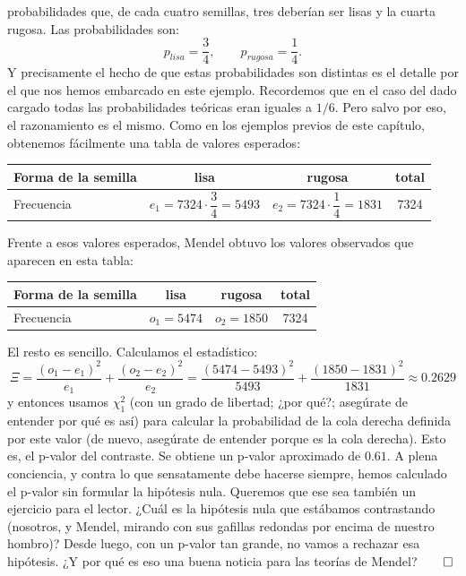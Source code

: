 \begin{ejemplo}
probabilidades
que, de cada cuatro semillas, tres deberían ser lisas y la cuarta rugosa. Las probabilidades son:
    \[p_{lisa}=\dfrac{3}{4},\qquad p_{rugosa}=\dfrac{1}{4}.\]
Y precisamente el hecho de que estas probabilidades son distintas es el detalle por el que nos
hemos embarcado en este ejemplo. Recordemos que en el caso del dado cargado todas las probabilidades
teóricas eran iguales a $1/6$. Pero salvo por eso, el razonamiento es el mismo.  Como en los
ejemplos previos de este capítulo, obtenemos fácilmente una tabla de valores esperados:
    \begin{center}
    \begin{tabular}{|l|c|c|c|}
      \hline
      Forma de la semilla & lisa & rugosa & total\\
      \hline
      Frecuencia \rule{0cm}{0.6cm}& $e_1=7324\cdot\dfrac{3}{4}=5493$ & $e_2=7324\cdot\dfrac{1}{4}=1831$ & 7324\\[2mm]
      \hline
    \end{tabular}
    \end{center}
Frente a esos valores esperados, Mendel obtuvo los valores observados que aparecen en esta tabla:
    \begin{center}
    \begin{tabular}{|l|c|c|c|}
      \hline
      Forma de la semilla & lisa & rugosa & total\\
      \hline
      Frecuencia \rule{0cm}{0.6cm}& $o_1=5474$ & $o_2=1850$ & 7324\\[2mm]
      \hline
    \end{tabular}
    \end{center}
El resto es sencillo. Calculamos el estadístico:
    \[\Xi=\dfrac{(o_1-e_1)^2}{e_1}+\dfrac{(o_2-e_2)^2}{e_2}= \dfrac{(5474-5493)^2}{5493}+\dfrac{(1850-1831)^2}{1831}\approx 0.2629\]
y entonces usamos $\chi^2_1$ (con un grado de libertad; ¿por qué?; asegúrate de entender por qué es así) para calcular la probabilidad de la cola derecha definida por este valor (de nuevo, asegúrate
de entender porque es la cola derecha). Esto es, el p-valor del contraste. Se obtiene un p-valor
aproximado de $0.61$. A plena conciencia, y contra lo que sensatamente debe hacerse siempre, hemos
calculado el p-valor sin formular la hipótesis nula. Queremos que ese sea también un ejercicio para
el lector. ¿Cuál es la hipótesis nula que estábamos contrastando (nosotros, y Mendel, mirando con
sus gafillas redondas por encima de nuestro hombro)? Desde luego, con un p-valor tan grande, no vamos a rechazar esa
hipótesis. ¿Y por qué es eso una buena noticia para las teorías de Mendel?\flushright$\qed$
\end{ejemplo}

